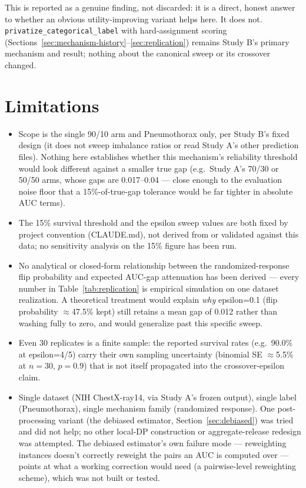 \documentclass[11pt]{article}
\begin{document}
This is reported as a genuine finding, not discarded: it is a direct, honest answer to whether an obvious utility-improving variant helps here. It does not. \texttt{privatize\_categorical\_label} with hard-assignment scoring (Sections~\ref{sec:mechanism-history}--\ref{sec:replication}) remains Study B's primary mechanism and result; nothing about the canonical sweep or its crossover changed.

\section{Limitations}
\begin{itemize}
\item Scope is the single 90/10 arm and Pneumothorax only, per Study B's fixed design (it does not sweep imbalance ratios or read Study A's other prediction files). Nothing here establishes whether this mechanism's reliability threshold would look different against a smaller true gap (e.g.\ Study A's 70/30 or 50/50 arms, whose gaps are 0.017--0.04 --- close enough to the evaluation noise floor that a 15\%-of-true-gap tolerance would be far tighter in absolute AUC terms).
\item The 15\% survival threshold and the epsilon sweep values are both fixed by project convention (CLAUDE.md), not derived from or validated against this data; no sensitivity analysis on the 15\% figure has been run.
\item No analytical or closed-form relationship between the randomized-response flip probability and expected AUC-gap attenuation has been derived --- every number in Table~\ref{tab:replication} is empirical simulation on one dataset realization. A theoretical treatment would explain \emph{why} epsilon=0.1 (flip probability $\approx$47.5\% kept) still retains a mean gap of 0.012 rather than washing fully to zero, and would generalize past this specific sweep.
\item Even 30 replicates is a finite sample: the reported survival rates (e.g.\ 90.0\% at epsilon=4/5) carry their own sampling uncertainty (binomial SE $\approx$5.5\% at $n=30$, $p=0.9$) that is not itself propagated into the crossover-epsilon claim.
\item Single dataset (NIH ChestX-ray14, via Study A's frozen output), single label (Pneumothorax), single mechanism family (randomized response). One post-processing variant (the debiased estimator, Section~\ref{sec:debiased}) was tried and did not help; no other local-DP construction or aggregate-release redesign was attempted. The debiased estimator's own failure mode --- reweighting instances doesn't correctly reweight the pairs an AUC is computed over --- points at what a working correction would need (a pairwise-level reweighting scheme), which was not built or tested.

\end{itemize}
\end{document}
